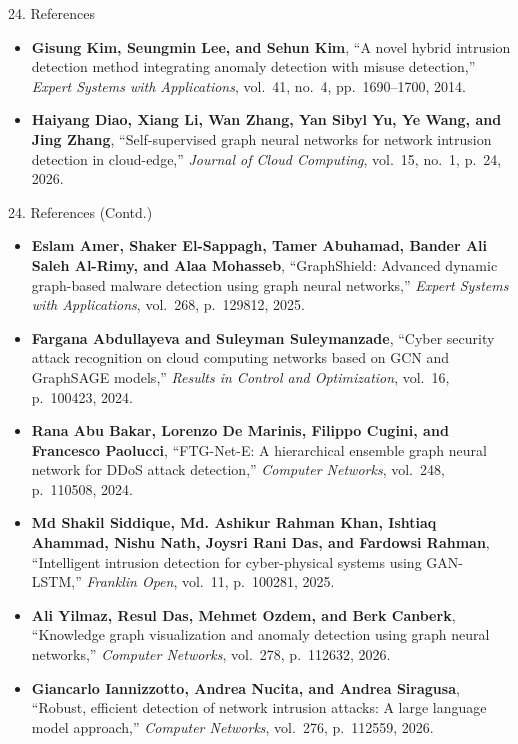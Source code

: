 \documentclass[aspectratio=169,10pt]{beamer}
\begin{document}
\begin{frame}[t]{24. References}
\begin{itemize}
  \item[\textbf{[7]}] \textbf{Gisung Kim, Seungmin Lee, and Sehun Kim}, ``A novel hybrid intrusion detection method integrating anomaly detection with misuse detection,'' \textit{Expert Systems with Applications}, vol.~41, no.~4, pp.~1690--1700, 2014.
  \item[\textbf{[8]}] \textbf{Haiyang Diao, Xiang Li, Wan Zhang, Yan Sibyl Yu, Ye Wang, and Jing Zhang}, ``Self-supervised graph neural networks for network intrusion detection in cloud-edge,'' \textit{Journal of Cloud Computing}, vol.~15, no.~1, p.~24, 2026.
\end{itemize}
\end{frame}

\begin{frame}[t]{24. References (Contd.)}
\vspace{-0.2em}
\fontsize{6.2pt}{8.0pt}\selectfont
\begin{itemize}\itemsep0.15em
  \item[\textbf{[9]}] \textbf{Eslam Amer, Shaker El-Sappagh, Tamer Abuhamad, Bander Ali Saleh Al-Rimy, and Alaa Mohasseb}, ``GraphShield: Advanced dynamic graph-based malware detection using graph neural networks,'' \textit{Expert Systems with Applications}, vol.~268, p.~129812, 2025.
  \item[\textbf{[10]}] \textbf{Fargana Abdullayeva and Suleyman Suleymanzade}, ``Cyber security attack recognition on cloud computing networks based on GCN and GraphSAGE models,'' \textit{Results in Control and Optimization}, vol.~16, p.~100423, 2024.
  \item[\textbf{[11]}] \textbf{Rana Abu Bakar, Lorenzo De Marinis, Filippo Cugini, and Francesco Paolucci}, ``FTG-Net-E: A hierarchical ensemble graph neural network for DDoS attack detection,'' \textit{Computer Networks}, vol.~248, p.~110508, 2024.
  \item[\textbf{[12]}] \textbf{Md Shakil Siddique, Md. Ashikur Rahman Khan, Ishtiaq Ahammad, Nishu Nath, Joysri Rani Das, and Fardowsi Rahman}, ``Intelligent intrusion detection for cyber-physical systems using GAN-LSTM,'' \textit{Franklin Open}, vol.~11, p.~100281, 2025.
  \item[\textbf{[13]}] \textbf{Ali Yilmaz, Resul Das, Mehmet Ozdem, and Berk Canberk}, ``Knowledge graph visualization and anomaly detection using graph neural networks,'' \textit{Computer Networks}, vol.~278, p.~112632, 2026.
  \item[\textbf{[14]}] \textbf{Giancarlo Iannizzotto, Andrea Nucita, and Andrea Siragusa}, ``Robust, efficient detection of network intrusion attacks: A large language model approach,'' \textit{Computer Networks}, vol.~276, p.~112559, 2026.

\end{itemize}
\end{frame}
\end{document}
